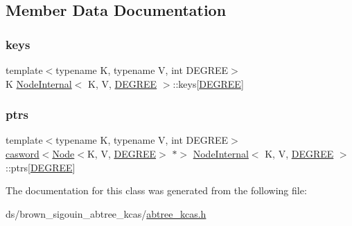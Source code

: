 \subsection{Member Data Documentation}
\mbox{\label{classNodeInternal_a9cae3b9c6a1b3fc1a61053eba2914150}} 
\subsubsection{\texorpdfstring{keys}{keys}}
{\footnotesize\ttfamily template$<$typename K, typename V, int D\+E\+G\+R\+EE$>$ \\
K \hyperlink{classNodeInternal}{Node\+Internal}$<$ K, V, \hyperlink{brown__sigouin__abtree__kcas_2adapter_8h_a5d88b17d70c985f2f2b8e987037fd6dd}{D\+E\+G\+R\+EE} $>$\+::keys\mbox{[}\hyperlink{brown__sigouin__abtree__kcas_2adapter_8h_a5d88b17d70c985f2f2b8e987037fd6dd}{D\+E\+G\+R\+EE}\mbox{]}}

\mbox{\label{classNodeInternal_a170d07866f92c7f9436bcf6699f3be91}} 
\subsubsection{\texorpdfstring{ptrs}{ptrs}}
{\footnotesize\ttfamily template$<$typename K, typename V, int D\+E\+G\+R\+EE$>$ \\
\hyperlink{structcasword}{casword}$<$\hyperlink{classNode}{Node}$<$K, V, \hyperlink{brown__sigouin__abtree__kcas_2adapter_8h_a5d88b17d70c985f2f2b8e987037fd6dd}{D\+E\+G\+R\+EE}$>$ $\ast$$>$ \hyperlink{classNodeInternal}{Node\+Internal}$<$ K, V, \hyperlink{brown__sigouin__abtree__kcas_2adapter_8h_a5d88b17d70c985f2f2b8e987037fd6dd}{D\+E\+G\+R\+EE} $>$\+::ptrs\mbox{[}\hyperlink{brown__sigouin__abtree__kcas_2adapter_8h_a5d88b17d70c985f2f2b8e987037fd6dd}{D\+E\+G\+R\+EE}\mbox{]}}



The documentation for this class was generated from the following file\+:\begin{DoxyCompactItemize}
\item 
ds/brown\+\_\+sigouin\+\_\+abtree\+\_\+kcas/\hyperlink{abtree__kcas_8h}{abtree\+\_\+kcas.\+h}\end{DoxyCompactItemize}
